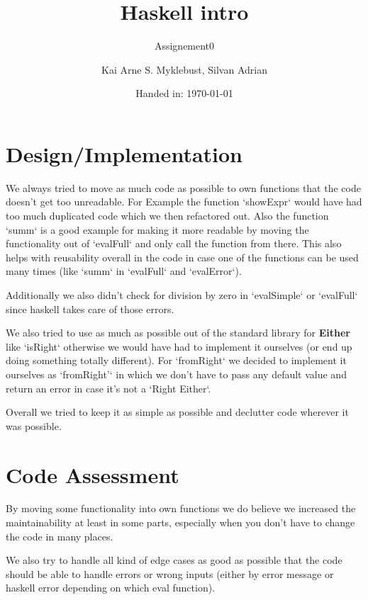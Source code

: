 \documentclass[12pt,a4paper]{article}
\begin{document}
\title{Haskell intro}
\subtitle{Assignement0}

\author{Kai Arne S. Myklebust, Silvan Adrian}
\date{Handed in: \today}
	
\maketitle
\tableofcontents

\section{Design/Implementation}
We always tried to move as much code as possible to own functions that the code doesn't get too unreadable.
For Example the function `showExpr` would have had too much duplicated code which we then refactored out.
Also the function `summ` is a good example for making it more readable by moving the functionality out of `evalFull` and only call the function from there.
This also helps with reusability overall in the code in case one of the functions can be used many times (like `summ` in `evalFull` and `evalError`).

Additionally we also didn't check for division by zero in `evalSimple` or `evalFull` since haskell takes care of those errors.

We also tried to use as much as possible out of the standard library for \textbf{Either} like `isRight` otherwise we would have had to implement it ourselves (or end up doing something totally different). For `fromRight` we decided to implement it ourselves as `fromRight'` in which we don't have to pass any default value and return an error in case it's not a `Right Either`.

Overall we tried to keep it as simple as possible and declutter code wherever it was possible.


\section{Code Assessment}

By moving some functionality into own functions we do believe we increased the maintainability at least in some parts, especially when you don't have to change the code in many places.

We also try to handle all kind of edge cases as good as possible that the code should be able to handle errors or wrong inputs (either by error message or haskell error depending on which eval function).
\end{document}
